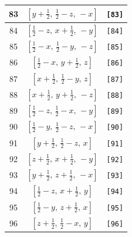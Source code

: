 \documentclass[fleqn,8pt]{jsarticle}
\begin{document}
\begin{longtable}{ccc}
83 & $\left[ y + \frac{1}{2},\, \frac{1}{2} - z,\, - x \right]$ & {\tt [83]} \\ \hline
84 & $\left[ \frac{1}{2} - z,\, x + \frac{1}{2},\, - y \right]$ & {\tt [84]} \\ \hline
85 & $\left[ \frac{1}{2} - x,\, \frac{1}{2} - y,\, - z \right]$ & {\tt [85]} \\ \hline
86 & $\left[ \frac{1}{2} - x,\, y + \frac{1}{2},\, z \right]$ & {\tt [86]} \\ \hline
87 & $\left[ x + \frac{1}{2},\, \frac{1}{2} - y,\, z \right]$ & {\tt [87]} \\ \hline
88 & $\left[ x + \frac{1}{2},\, y + \frac{1}{2},\, - z \right]$ & {\tt [88]} \\ \hline
89 & $\left[ \frac{1}{2} - z,\, \frac{1}{2} - x,\, - y \right]$ & {\tt [89]} \\ \hline
90 & $\left[ \frac{1}{2} - y,\, \frac{1}{2} - z,\, - x \right]$ & {\tt [90]} \\ \hline
91 & $\left[ y + \frac{1}{2},\, \frac{1}{2} - z,\, x \right]$ & {\tt [91]} \\ \hline
92 & $\left[ z + \frac{1}{2},\, x + \frac{1}{2},\, - y \right]$ & {\tt [92]} \\ \hline
93 & $\left[ y + \frac{1}{2},\, z + \frac{1}{2},\, - x \right]$ & {\tt [93]} \\ \hline
94 & $\left[ \frac{1}{2} - z,\, x + \frac{1}{2},\, y \right]$ & {\tt [94]} \\ \hline
95 & $\left[ \frac{1}{2} - y,\, z + \frac{1}{2},\, x \right]$ & {\tt [95]} \\ \hline
96 & $\left[ z + \frac{1}{2},\, \frac{1}{2} - x,\, y \right]$ & {\tt [96]} \\
\end{longtable}
\end{document}
